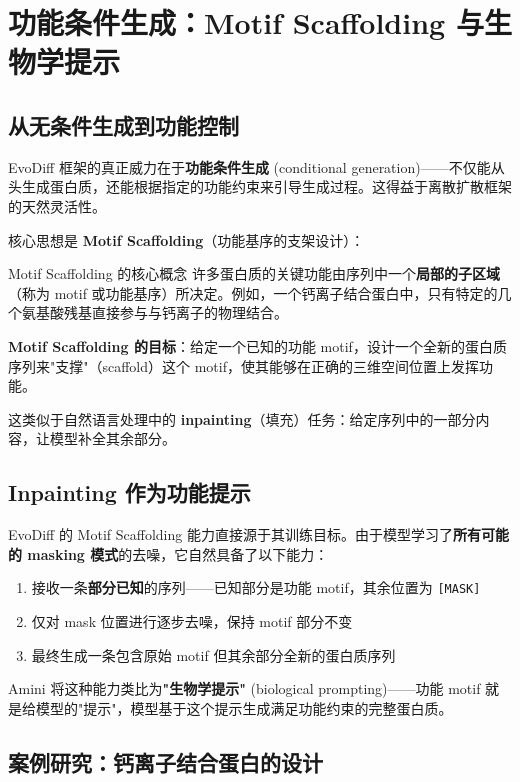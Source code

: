 \section{功能条件生成：Motif Scaffolding 与生物学提示}

\subsection{从无条件生成到功能控制}

EvoDiff 框架的真正威力在于\textbf{功能条件生成} (conditional generation)——不仅能从头生成蛋白质，还能根据指定的功能约束来引导生成过程。这得益于离散扩散框架的天然灵活性。

核心思想是 \textbf{Motif Scaffolding}（功能基序的支架设计）：

\begin{importantbox}{Motif Scaffolding 的核心概念}
许多蛋白质的关键功能由序列中一个\textbf{局部的子区域}（称为 motif 或功能基序）所决定。例如，一个钙离子结合蛋白中，只有特定的几个氨基酸残基直接参与与钙离子的物理结合。

\textbf{Motif Scaffolding 的目标}：给定一个已知的功能 motif，设计一个全新的蛋白质序列来"支撑"（scaffold）这个 motif，使其能够在正确的三维空间位置上发挥功能。

这类似于自然语言处理中的 \textbf{inpainting}（填充）任务：给定序列中的一部分内容，让模型补全其余部分。
\end{importantbox}

\subsection{Inpainting 作为功能提示}

EvoDiff 的 Motif Scaffolding 能力直接源于其训练目标。由于模型学习了\textbf{所有可能的 masking 模式}的去噪，它自然具备了以下能力：

\begin{enumerate}
    \item 接收一条\textbf{部分已知}的序列——已知部分是功能 motif，其余位置为 \texttt{[MASK]}
    \item 仅对 mask 位置进行逐步去噪，保持 motif 部分不变
    \item 最终生成一条包含原始 motif 但其余部分全新的蛋白质序列
\end{enumerate}

Amini 将这种能力类比为\textbf{"生物学提示"} (biological prompting)——功能 motif 就是给模型的"提示"，模型基于这个提示生成满足功能约束的完整蛋白质。

\subsection{案例研究：钙离子结合蛋白的设计}

